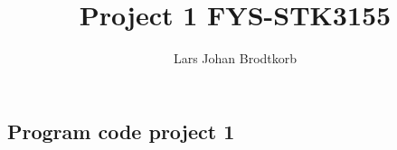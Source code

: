 \documentclass[10pt,a4paper]{article}
\begin{document}
\title{Project 1 FYS-STK3155}
\author{Lars Johan Brodtkorb}
\maketitle


\tableofcontents
\newpage






\subsection{Program code project 1}
\label{sec:programcode_3}



%
\end{document}
